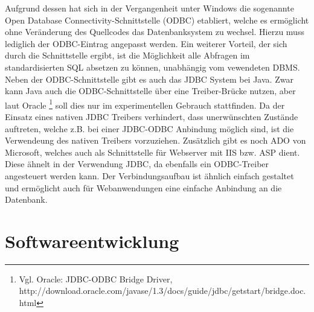 Aufgrund dessen hat sich in der Vergangenheit unter Windows die sogenannte Open Database Connectivity-Schnittstelle (ODBC) etabliert, welche es ermöglicht ohne Veränderung des Quellcodes das Datenbanksystem zu wechsel.
Hierzu muss lediglich der ODBC-Eintrag angepasst werden. Ein weiterer Vorteil, der sich durch die Schnittstelle ergibt, ist die Möglichkeit alle Abfragen im standardisierten SQL absetzen zu können, unabhängig vom vewendeten DBMS.
Neben der ODBC-Schnittstelle gibt es auch das JDBC System bei Java. Zwar kann Java auch die ODBC-Schnittstelle über eine Treiber-Brücke nutzen, aber laut Oracle \footnote{Vgl. Oracle: JDBC-ODBC Bridge Driver, http://download.oracle.com/javase/1.3/docs/guide/jdbc/getstart/bridge.doc.html} soll dies nur im experimentellen Gebrauch stattfinden.
Da der Einsatz eines nativen JDBC Treibers verhindert, dass unerwünschten Zustände auftreten, welche z.B. bei einer JDBC-ODBC Anbindung möglich sind, ist die Verwendeung des nativen Treibers vorzuziehen.
Zusätzlich gibt es noch ADO von Microsoft, welches auch als Schnittstelle für Webserver mit IIS bzw. ASP dient.
Diese ähnelt in der Verwendung JDBC, da ebenfalls ein ODBC-Treiber angesteuert werden kann.
Der Verbindungsaufbau ist ähnlich einfach gestaltet und ermöglicht auch für Webanwendungen eine einfache Anbindung an die Datenbank.

\section{Softwareentwicklung}
\label{sec:softdev}

